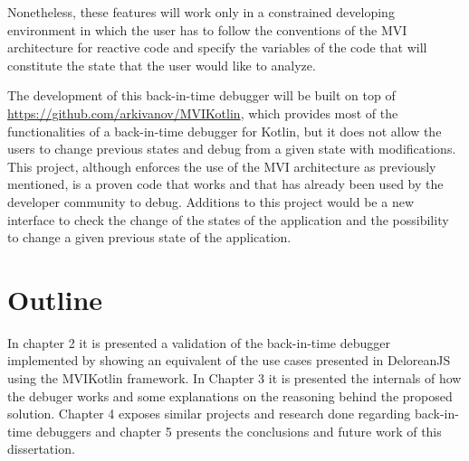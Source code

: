 Nonetheless, these features will work only in a constrained developing environment in which the user has to follow the conventions of the MVI architecture for reactive code and specify the variables of the code that will constitute the state that the user would like to analyze.

The development of this back-in-time debugger will be built on top of \url{https://github.com/arkivanov/MVIKotlin}, which provides most of the functionalities of a back-in-time debugger for Kotlin, but it does not allow the users to change previous states and debug from a given state with modifications. This project, although enforces the use of the MVI architecture as previously mentioned, is a proven code that works and that has already been used by the developer community to debug. Additions to this project would be a new interface to check the change of the states of the application and the possibility to change a given previous state of the application.

\section{Outline}

In chapter 2 it is presented a validation of the back-in-time debugger implemented by showing an equivalent of the use cases presented in DeloreanJS using the MVIKotlin framework. In Chapter 3 it is presented the internals of how the debuger works and some explanations on the reasoning behind the proposed solution. Chapter 4 exposes similar projects and research done regarding back-in-time debuggers and chapter 5 presents the conclusions and future work of this dissertation.

\endinput

